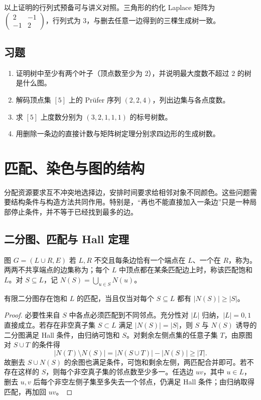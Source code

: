 \documentclass[UTF8,12pt,a4paper,fontset=fandol]{ctexbook}
\begin{document}
以上证明的行列式预备可与讲义\cite{matrix-tree-notes}对照。三角形的约化 Laplace 矩阵为 $\begin{pmatrix}2&-1\\-1&2\end{pmatrix}$，行列式为 $3$，与删去任意一边得到的三棵生成树一致。

\section{习题}
\begin{enumerate}
  \item\label{ex:graphs-trees-1} 证明树中至少有两个叶子（顶点数至少为 $2$），并说明最大度数不超过 $2$ 的树是什么图。
  \item\label{ex:graphs-trees-2} 解码顶点集 $[5]$ 上的 Pr\"ufer 序列 $(2,2,4)$，列出边集与各点度数。
  \item\label{ex:graphs-trees-3} 求 $[5]$ 上度数分别为 $(3,2,1,1,1)$ 的标号树数。
  \item\label{ex:graphs-trees-4} 用删除一条边的直接计数与矩阵树定理分别求四边形的生成树数。
\end{enumerate}

\chapter{匹配、染色与图的结构}
\label{ch:matching-coloring}

分配资源要求互不冲突地选择边，安排时间要求给相邻对象不同颜色。这些问题需要结构条件与构造方法共同作用。特别是，“再也不能直接加入一条边”只是一种局部停止条件，并不等于已经找到最多的边。

\section{二分图、匹配与 Hall 定理}

\begin{definition}
图 $G=(L\cup R,E)$ 若 $L,R$ 不交且每条边恰有一个端点在 $L$、一个在 $R$，称为。两两不共享端点的边集称为；每个 $L$ 中顶点都在某条匹配边上时，称该匹配饱和 $L$。对 $S\subseteq L$，记 $N(S)=\bigcup_{u\in S}N(u)$。
\end{definition}

\begin{theorem}
有限二分图存在饱和 $L$ 的匹配，当且仅当对每个 $S\subseteq L$ 都有 $|N(S)|\ge|S|$。
\end{theorem}
\begin{proof}
必要性来自 $S$ 中各点必须匹配到不同邻点。充分性对 $|L|$ 归纳，$|L|=0,1$ 直接成立。若存在非空真子集 $S\subset L$ 满足 $|N(S)|=|S|$，则 $S$ 与 $N(S)$ 诱导的二分图满足 Hall 条件，由归纳可饱和 $S$。对剩余左侧点集的任意子集 $T$，由原图对 $S\cup T$ 的条件得
\[
 |N(T)\setminus N(S)|=|N(S\cup T)|-|N(S)|\ge|T|.
\]
故删去 $S\cup N(S)$ 的余图也满足条件，可饱和剩余左侧，两匹配合并即可。若不存在这样的 $S$，则每个非空真子集的邻点数至少多一。任选边 $uv$，其中 $u\in L$，删去 $u,v$ 后每个非空左侧子集至多失去一个邻点，仍满足 Hall 条件；由归纳取得匹配，再加回 $uv$。
\end{proof}
\end{document}
